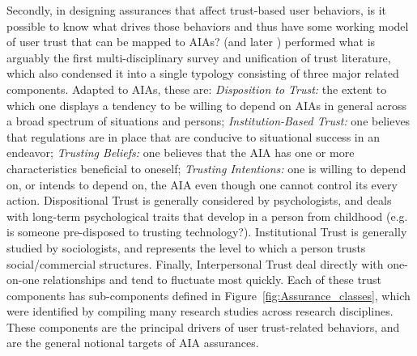         Secondly, in designing assurances that affect trust-based user behaviors, is it possible to know what drives those behaviors and thus have some working model of user trust that can be mapped to AIAs? 
        \citet{McKnight1998-ty} (and later \cite{McKnight2001-fa}) performed what is arguably the first multi-disciplinary survey and unification of trust literature, which also condensed it into a single typology consisting of three major related components. 
%       
%
%
        Adapted to AIAs, these are: \textit{Disposition to Trust:} the extent to which one displays a tendency to be willing to depend on AIAs in general across a broad spectrum of situations and persons; \textit{Institution-Based Trust:} one believes that regulations are in place that are conducive to situational success in an endeavor; \textit{Trusting Beliefs:} one believes that the AIA has one or more characteristics beneficial to oneself; \textit{Trusting Intentions:} one is willing to depend on, or intends to depend on, the AIA even though one cannot control its every action. 
        Dispositional Trust is generally considered by psychologists, and deals with long-term psychological traits that develop in a person from childhood (e.g. is someone pre-disposed to trusting technology?).  
        Institutional Trust %
        is generally studied by sociologists, and represents the level to which a person trusts social/commercial structures. 
        Finally, Interpersonal Trust deal directly with one-on-one relationships and tend to fluctuate most quickly. 
        Each of these trust components has sub-components defined in Figure~\ref{fig:Assurance_classes}, which were identified by compiling many research studies across research disciplines. 
        These components are the principal drivers of user trust-related behaviors, and are the general notional targets of AIA assurances.

